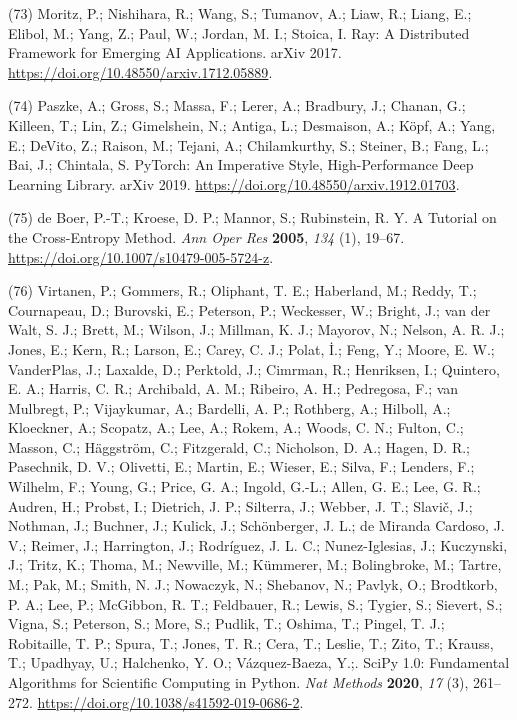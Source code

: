 \documentclass[  ASAPversion,
  ,
  9pt]{elife}
\newenvironment{cslreferences}%
  {}%
  {\par}
\begin{document}
\begin{cslreferences}
\leavevmode\hypertarget{ref-19MS2ZVR1}{}%
(73) Moritz, P.; Nishihara, R.; Wang, S.; Tumanov, A.; Liaw, R.; Liang, E.; Elibol, M.; Yang, Z.; Paul, W.; Jordan, M. I.; Stoica, I. Ray: A Distributed Framework for Emerging AI Applications. arXiv 2017. \url{https://doi.org/10.48550/arxiv.1712.05889}.

\leavevmode\hypertarget{ref-iOWq2JB8}{}%
(74) Paszke, A.; Gross, S.; Massa, F.; Lerer, A.; Bradbury, J.; Chanan, G.; Killeen, T.; Lin, Z.; Gimelshein, N.; Antiga, L.; Desmaison, A.; Köpf, A.; Yang, E.; DeVito, Z.; Raison, M.; Tejani, A.; Chilamkurthy, S.; Steiner, B.; Fang, L.; Bai, J.; Chintala, S. PyTorch: An Imperative Style, High-Performance Deep Learning Library. arXiv 2019. \url{https://doi.org/10.48550/arxiv.1912.01703}.

\leavevmode\hypertarget{ref-hchMCnC1}{}%
(75) de Boer, P.-T.; Kroese, D. P.; Mannor, S.; Rubinstein, R. Y. A Tutorial on the Cross-Entropy Method. \emph{Ann Oper Res} \textbf{2005}, \emph{134} (1), 19--67. \url{https://doi.org/10.1007/s10479-005-5724-z}.

\leavevmode\hypertarget{ref-8Miti2Gz}{}%
(76) Virtanen, P.; Gommers, R.; Oliphant, T. E.; Haberland, M.; Reddy, T.; Cournapeau, D.; Burovski, E.; Peterson, P.; Weckesser, W.; Bright, J.; van der Walt, S. J.; Brett, M.; Wilson, J.; Millman, K. J.; Mayorov, N.; Nelson, A. R. J.; Jones, E.; Kern, R.; Larson, E.; Carey, C. J.; Polat, İ.; Feng, Y.; Moore, E. W.; VanderPlas, J.; Laxalde, D.; Perktold, J.; Cimrman, R.; Henriksen, I.; Quintero, E. A.; Harris, C. R.; Archibald, A. M.; Ribeiro, A. H.; Pedregosa, F.; van Mulbregt, P.; Vijaykumar, A.; Bardelli, A. P.; Rothberg, A.; Hilboll, A.; Kloeckner, A.; Scopatz, A.; Lee, A.; Rokem, A.; Woods, C. N.; Fulton, C.; Masson, C.; Häggström, C.; Fitzgerald, C.; Nicholson, D. A.; Hagen, D. R.; Pasechnik, D. V.; Olivetti, E.; Martin, E.; Wieser, E.; Silva, F.; Lenders, F.; Wilhelm, F.; Young, G.; Price, G. A.; Ingold, G.-L.; Allen, G. E.; Lee, G. R.; Audren, H.; Probst, I.; Dietrich, J. P.; Silterra, J.; Webber, J. T.; Slavič, J.; Nothman, J.; Buchner, J.; Kulick, J.; Schönberger, J. L.; de Miranda Cardoso, J. V.; Reimer, J.; Harrington, J.; Rodríguez, J. L. C.; Nunez-Iglesias, J.; Kuczynski, J.; Tritz, K.; Thoma, M.; Newville, M.; Kümmerer, M.; Bolingbroke, M.; Tartre, M.; Pak, M.; Smith, N. J.; Nowaczyk, N.; Shebanov, N.; Pavlyk, O.; Brodtkorb, P. A.; Lee, P.; McGibbon, R. T.; Feldbauer, R.; Lewis, S.; Tygier, S.; Sievert, S.; Vigna, S.; Peterson, S.; More, S.; Pudlik, T.; Oshima, T.; Pingel, T. J.; Robitaille, T. P.; Spura, T.; Jones, T. R.; Cera, T.; Leslie, T.; Zito, T.; Krauss, T.; Upadhyay, U.; Halchenko, Y. O.; Vázquez-Baeza, Y.;. SciPy 1.0: Fundamental Algorithms for Scientific Computing in Python. \emph{Nat Methods} \textbf{2020}, \emph{17} (3), 261--272. \url{https://doi.org/10.1038/s41592-019-0686-2}.


\end{cslreferences}
\end{document}
